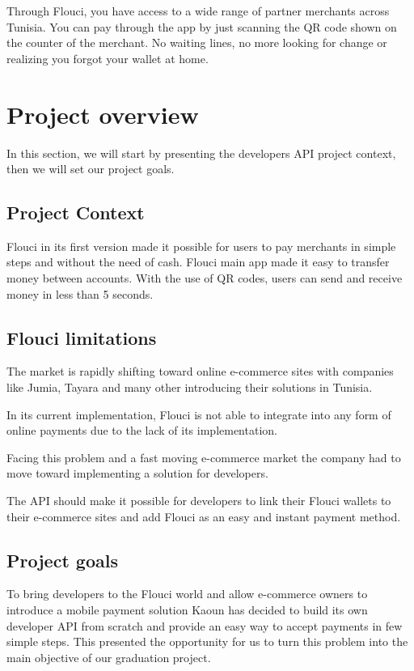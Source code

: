 \begin{spacing}{1.2}
\begin{itemize}
  Through Flouci, you have access to a wide range of partner merchants across Tunisia. You can pay through the app by just scanning the QR code shown on the counter of the merchant. No waiting lines, no more looking for change or realizing you forgot your wallet at home.
\end{itemize}

\section{Project overview}
In this section, we will start by presenting the developers API project context, then we will set our project goals.
\subsection{Project Context}
Flouci in its first version made it possible for users to pay merchants in simple steps and without the need of cash.
Flouci main app made it easy to transfer money between accounts. With the use of QR codes, users can send and receive money in less than 5 seconds.

\subsection{Flouci limitations}
The market is rapidly shifting toward online e-commerce sites with companies like Jumia, Tayara and many other introducing their solutions in Tunisia.

In its current implementation, Flouci is not able to integrate into any form of online payments due to the lack of its implementation.

Facing this problem and a fast moving e-commerce market the company had to move toward implementing a solution for developers.

The API should make it possible for developers to link their Flouci wallets to their e-commerce sites and add Flouci as an easy and instant payment method.
\subsection{Project goals}
To bring developers to the Flouci world and allow e-commerce owners to introduce a mobile payment solution Kaoun has decided to build its own developer API from scratch and provide an easy way to accept payments in few simple steps. This presented the opportunity for us to turn this problem into the main objective of our graduation project.


\end{spacing}
